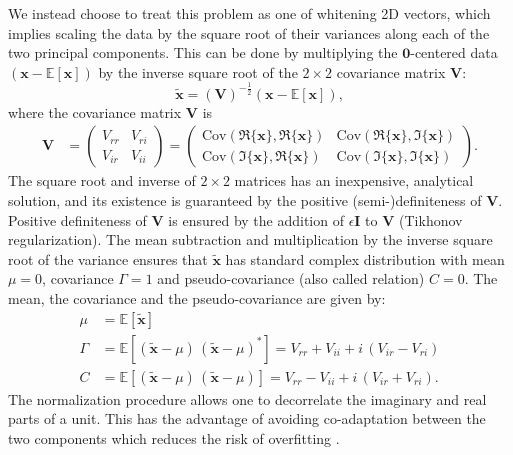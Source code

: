 \documentclass{article}
\begin{document}
We instead choose to treat this problem as one of whitening 2D vectors, which implies scaling the data by the square root of their variances along each of the two principal components. This can be done by multiplying the $\boldsymbol 0$-centered data $\left(\boldsymbol{x} - \mathbb{E}[\boldsymbol x] \right)$ by the inverse square root of the $2 \times 2$ covariance matrix $\boldsymbol V$:
\begin{equation*} 
\boldsymbol{\tilde x} = (\boldsymbol V)^{-\frac{1}{2}} \left(\boldsymbol{x} - \mathbb{E}[\boldsymbol x] \right),
\end{equation*}
where the covariance matrix $\boldsymbol V$ is
\begin{align*}
\boldsymbol V &= \left( \begin{array}{cc} V_{rr} & V_{ri} \\ V_{ir} & V_{ii} \end{array} \right) = \left( \begin{array}{cc} \textrm{Cov}(\Re\{\boldsymbol x\}, \Re\{\boldsymbol x\}) & \textrm{Cov}(\Re\{\boldsymbol x\}, \Im\{\boldsymbol x\}) \\ \textrm{Cov}(\Im\{\boldsymbol x\}, \Re\{\boldsymbol x\}) & \textrm{Cov}(\Im\{\boldsymbol x\}, \Im\{\boldsymbol x\}) \end{array} \right).
\end{align*}
The square root and inverse of $2 \times 2$ matrices has an inexpensive, analytical solution, and its existence is guaranteed by the positive (semi-)definiteness of $\boldsymbol V$. Positive definiteness of $\boldsymbol V$ is ensured by the addition of $\epsilon \boldsymbol I$ to $\boldsymbol V$ (Tikhonov regularization). The mean subtraction and multiplication by the inverse square root of the variance ensures that $\tilde{\boldsymbol x}$ has standard complex distribution with mean $\mu = 0$, covariance $\Gamma = 1$ and pseudo-covariance (also called relation) $C = 0$. The mean, the covariance and the pseudo-covariance are given by:
\begin{equation}\label{gamma_C}
\begin{aligned}
\mu &= \mathbb{E} \left[ \tilde{\boldsymbol x} \right] \\ 
\Gamma &= \mathbb{E} \left[ (\tilde{\boldsymbol x} - \mu) \, (\tilde{\boldsymbol x} - \mu)^{*} \right] = V_{rr} + V_{ii} + i \, (V_{ir} - V_{ri})\\
C &= \mathbb{E} \left[ (\tilde{\boldsymbol x} - \mu) \, (\tilde{\boldsymbol x} - \mu) \right] = V_{rr} - V_{ii} + i \, (V_{ir} + V_{ri}).
\end{aligned}
\end{equation}
The normalization procedure allows one to decorrelate the imaginary and real parts of a unit. This has the advantage of avoiding co-adaptation between the two components which reduces the risk of overfitting \citep{cogswell2015reducing, srivastava2014dropout}.
\end{document}
